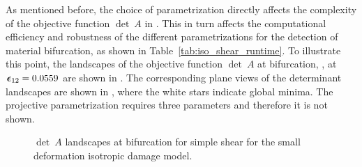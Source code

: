\documentclass[12pt]{article}
\numberwithin{equation}{section}
\begin{document}
As mentioned before, the choice of parametrization directly affects
the complexity of the objective function $\det~A$ in
. This in turn affects the
computational efficiency and robustness of the different
parametrizations for the detection of material bifurcation, as shown
in Table~\ref{tab:iso_shear_runtime}. To illustrate this point, the
landscapes of the objective function $\det~A$ at bifurcation, \ie, at
${\boldsymbol{\epsilon}}_{12}=0.0559$ are shown in . The
corresponding plane views of the determinant landscapes are shown in
, where the white stars indicate global
minima. The projective parametrization requires three parameters and
therefore it is not shown.

\begin{figure}[htbp]
   \centering {}   
   \caption{$\det~A$ landscapes at bifurcation for simple shear
     for the small deformation isotropic damage model.}
   \label{fig:iso_shear_detA}
 \end{figure}
\end{document}
